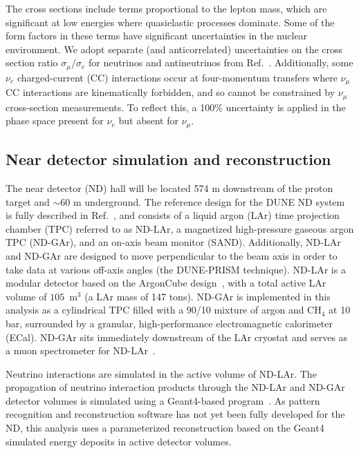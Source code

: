 The cross sections include terms proportional to the lepton mass, which are significant at low energies where quasielastic processes dominate. Some of the form factors in these terms have significant uncertainties in the nuclear environment. We adopt separate (and anticorrelated) uncertainties on the cross section ratio $\sigma_\mu/\sigma_e$ for neutrinos and antineutrinos from Ref.~\cite{Day:2012gb}. Additionally, some $\nu_e$ charged-current (CC) interactions occur at four-momentum transfers where $\nu_\mu$ CC interactions are kinematically forbidden, and so cannot be constrained by $\nu_\mu$ cross-section measurements. To reflect this, a 100\% uncertainty is applied in the phase space present for $\nu_e$ but absent for $\nu_\mu$.

\subsection{Near detector simulation and reconstruction}
The near detector (ND) hall will be located 574 m downstream of the proton target and $\sim$60 m underground. The reference design for the DUNE ND system is fully described in Ref.~\cite{AbedAbud:2021hpb}, and consists of a liquid argon (LAr) time projection chamber (TPC) referred to as ND-LAr, a magnetized high-pressure gaseous argon TPC (ND-GAr), and an on-axis beam monitor (SAND). Additionally, ND-LAr and ND-GAr are designed to move perpendicular to the beam axis in order to take data at various off-axis angles (the DUNE-PRISM technique). ND-LAr is a modular detector based on the ArgonCube design~\cite{argoncube_loi, Dwyer:2018phu, arclight}, with a total active LAr volume of $105$~m$^{3}$ (a LAr mass of 147 tons). ND-GAr is implemented in this analysis as a cylindrical TPC filled with a 90/10 mixture of argon and CH$_{4}$ at 10 bar, surrounded by a granular, high-performance electromagnetic calorimeter (ECal). ND-GAr sits immediately downstream of the LAr cryostat and serves as a muon spectrometer for ND-LAr~\cite{Emberger:2018pgr}.

Neutrino interactions are simulated in the active volume of ND-LAr. The propagation of neutrino interaction products through the ND-LAr and ND-GAr detector volumes is simulated using a Geant4-based program~\cite{Agostinelli:2002hh}. As pattern recognition and reconstruction software has not yet been fully developed for the ND, this analysis uses a parameterized reconstruction based on the Geant4 simulated energy deposits in active detector volumes.

